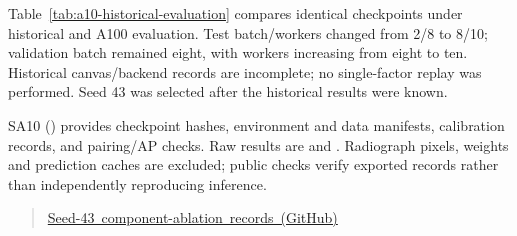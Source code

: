 Table~\ref{tab:a10-historical-evaluation} compares identical checkpoints under historical and A100 evaluation. Test batch/workers changed from 2/8 to 8/10; validation batch remained eight, with workers increasing from eight to ten. Historical canvas/backend records are incomplete; no single-factor replay was performed. Seed 43 was selected after the historical results were known.

SA10 () provides checkpoint hashes, environment and data manifests, calibration records, and pairing/AP checks. Raw results are  and . Radiograph pixels, weights and prediction caches are excluded; public checks verify exported records rather than independently reproducing inference.

\begin{quote}\small\mbox{\href{https://github.com/HopperHou/X-ray-thesis/tree/81d585e01480ccafe99ac60ebf1806db7b84758c/supplementary/seed43-component-ablation}{Seed-43 component-ablation records (GitHub)}}\end{quote}
